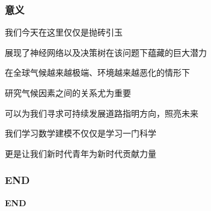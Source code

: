 \documentclass[10pt]{beamer}
\begin{document}
\begin{frame}
	\frametitle{意义}
	我们今天在这里仅仅是抛砖引玉

	展现了神经网络以及决策树在该问题下蕴藏的巨大潜力

	在全球气候越来越极端、环境越来越恶化的情形下

	研究气候因素之间的关系尤为重要

	可以为我们寻求可持续发展道路指明方向，照亮未来

	我们学习数学建模不仅仅是学习一门科学

	更是让我们新时代青年为新时代贡献力量
\end{frame}

\begin{frame}
	\frametitle{END}
	\begin{center}
		\Huge
		\textbf{END}
	\end{center}
\end{frame}
\end{document}

